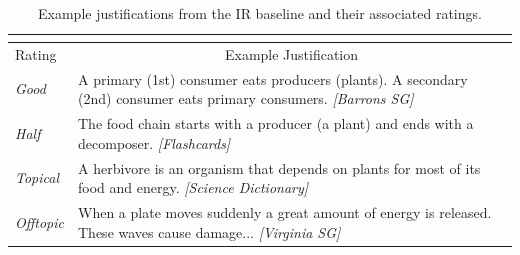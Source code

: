 {\begin{table}[t]
\begin{center}
\begin{footnotesize}
\begin{tabularx}{\textwidth}{p{1cm}p{11.5cm}}
\multicolumn{1}{c}{} & \multicolumn{1}{c}{} \\				
\hline
\multicolumn{1}{l}{Rating} & \multicolumn{1}{c}{Example Justification} \\
\hline			
{\em Good }		&	A primary (1st) consumer eats producers (plants). A secondary (2nd) consumer eats primary consumers. {\em [Barrons SG]}  	\\
{\em Half }		&	The food chain starts with a producer (a plant) and ends with a decomposer. {\em [Flashcards]} \\
{\em Topical }	&   A herbivore is an organism that depends on plants for most of its food and energy. {\em [Science Dictionary]} \\
{\em Offtopic }	&	When a plate moves suddenly a great amount of energy is released.  These waves cause damage...  {\em [Virginia SG]} \\
\end{tabularx}
\end{footnotesize}
\caption{{ Example justifications from the IR baseline and their associated ratings. }} %

\label{tab:justificationsIRexamples}

\end{center}
\end{table}


%
%



}
